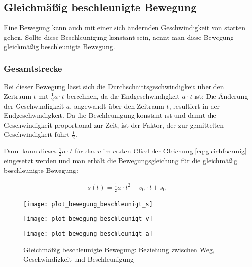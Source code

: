 \subsection{Gleichmäßig beschleunigte Bewegung}

Eine Bewegung kann auch mit einer sich ändernden Geschwindigkeit von statten gehen. Sollte diese Beschleunigung konstant sein, nennt man diese Bewegung gleichmäßig beschleunigte Bewegung.

\subsubsection{Gesamtstrecke}

Bei dieser Bewegung lässt sich die Durchschnittsgeschwindigkeit über den Zeitraum $t$ mit $\frac{1}{2}a \cdot t$ berechnen, da die Endgeschwindigkeit $a \cdot t$ ist: Die Änderung der Geschwindigkeit $a$, angewandt über den Zeitraum $t$, resultiert in der Endgeschwindigkeit. Da die Beschleunigung konstant ist und damit die Geschwindigkeit proportional zur Zeit, ist der Faktor, der zur gemittelten Geschwindigkeit führt $\frac{1}{2}$.

Dann kann dieses $\frac{1}{2}a \cdot t$ für das $v$ im ersten Glied der Gleichung \ref{eq:gleichfoermig} eingesetzt werden und man erhält die Bewegungsgleichung für die gleichmäßig beschleunigte Bewegung:

\begin{align} \label{eq:streckegleichmaessig}
	s(t) = \frac{1}{2}a \cdot t^2 + v_0 \cdot t + s_0
\end{align}

\begin{figure}[h!]
	\centering
	\begin{minipage}[b]{0.32\linewidth}
		\begin{comment} Gnuplot:
set xlabel "t"
set ylabel "s(t)"
set output "plot_bewegung_beschleunigt_s.png"
plot 0.5 * 1 * x * x ls 1
		\end{comment}
    	\texttt{[image: plot\_bewegung\_beschleunigt\_s]}
	\end{minipage}
	\begin{minipage}[b]{0.32\linewidth}
		\begin{comment} Gnuplot:
set xlabel "t"
set ylabel "v(t)"
set output "plot_bewegung_beschleunigt_v.png"
plot x ls 1
		\end{comment}
    	\texttt{[image: plot\_bewegung\_beschleunigt\_v]}
	\end{minipage}
	\begin{minipage}[b]{0.32\linewidth}
		\begin{comment} Gnuplot:
set xlabel "t"
set ylabel "a(t)"
set output "plot_bewegung_beschleunigt_a.png"
plot 1 ls 1
		\end{comment}
    	\texttt{[image: plot\_bewegung\_beschleunigt\_a]}
	\end{minipage}
	\caption{Gleichmäßig beschleunigte Bewegung: Beziehung zwischen Weg, Geschwindigkeit und Beschleunigung}
	\label{fig:beschleunigt}
\end{figure}

